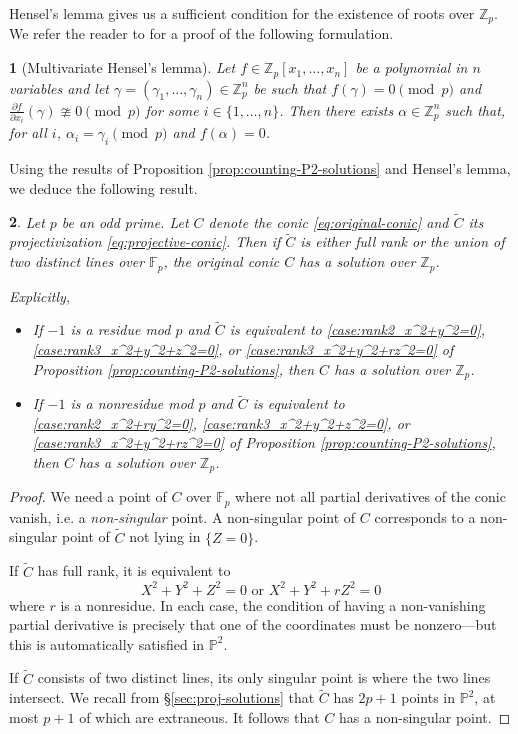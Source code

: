\documentclass[10pt,a4paper]{amsart}
\numberwithin{equation}{section}
\numberwithin{figure}{section}
\theoremstyle{definition}
\theoremstyle{remark}
\theoremstyle{plain}
\newtheorem{thm}{\protect\theoremname}[section]
\theoremstyle{plain}
\theoremstyle{definition}
\newtheorem{defn}{\protect\definitionname}[section]
\theoremstyle{plain}
\theoremstyle{plain}
\providecommand{\definitionname}{Definition}
\providecommand{\theoremname}{Theorem}
\renewcommand{\P}{\mathbb{P}}
\newcommand{\F}{\mathbb{F}}
\newcommand{\Z}{\mathbb{Z}}
\newcommand{\Q}{\mathbb{Q}}
\begin{document}
	Hensel's lemma gives us a sufficient condition for the existence of roots over $\Z_p$. We refer the reader to \cite{henselMO} for a proof of the following formulation.
	\begin{thm}[Multivariate Hensel's lemma]\label{thm:hensels-one-eq}
		Let $f \in \Z_p[x_1,\ldots,x_n]$ be a polynomial in $n$ variables and let $\gamma = (\gamma_1,\ldots,\gamma_n)\in \Z_p^n$ be such that $f(\gamma) = 0 \pmod p$ and $\frac{\partial f}{\partial x_i}(\gamma) \ncong 0 \pmod p$ for some $i\in \{1,\ldots,n\}$. Then there exists $\alpha \in \Z_p^n$ such that, for all $i$, $\alpha_i = \gamma_i \pmod p$ and $f(\alpha) = 0$.
	\end{thm}
	Using the results of Proposition \ref{prop:counting-P2-solutions} and Hensel's lemma, we deduce the following result.
	\begin{thm}\label{thm:existence-over-Zp}
		Let $p$ be an odd prime. Let $C$ denote the conic \eqref{eq:original-conic} and $\widetilde{C}$ its projectivization \eqref{eq:projective-conic}. Then if $\widetilde{C}$ is either full rank or the union of two distinct lines over $\F_p$, the original conic $C$ has a solution over $\Z_p$.
		
		Explicitly,
		\begin{itemize}
			\item If $-1$ is a residue mod $p$ and $\widetilde{C}$ is equivalent to \eqref{case:rank2_x^2+y^2=0}, \eqref{case:rank3_x^2+y^2+z^2=0}, or \eqref{case:rank3_x^2+y^2+rz^2=0} of Proposition \ref{prop:counting-P2-solutions}, then $C$ has a solution over $\Z_p$.
			\item If $-1$ is a nonresidue mod $p$ and $\widetilde{C}$ is equivalent to \eqref{case:rank2_x^2+ry^2=0}, \eqref{case:rank3_x^2+y^2+z^2=0}, or \eqref{case:rank3_x^2+y^2+rz^2=0} of Proposition \ref{prop:counting-P2-solutions}, then $C$ has a solution over $\Z_p$.
		\end{itemize}
	\end{thm}
	\begin{proof}
		We need a point of $C$ over $\F_p$ where not all partial derivatives of the conic vanish, i.e. a \emph{non-singular} point. A non-singular point of $C$ corresponds to a non-singular point of $\widetilde{C}$ not lying in $\{Z=0\}$.
		
		If $\widetilde{C}$ has full rank, it is equivalent to
		\[
		X^2 + Y^2 + Z^2 = 0 \text{ or } X^2 + Y^2 + rZ^2 = 0
		\]
		where $r$ is a nonresidue. In each case, the condition of having a non-vanishing partial derivative is precisely that one of the coordinates must be nonzero---but this is automatically satisfied in $\P^2$.
		
		If $\widetilde{C}$ consists of two distinct lines, its only singular point is where the two lines intersect. We recall from \S\ref{sec:proj-solutions} that $\widetilde{C}$ has $2p+1$ points in $\P^2$, at most $p+1$ of which are extraneous. It follows that $C$ has a non-singular point.
	\end{proof}
\end{document}
